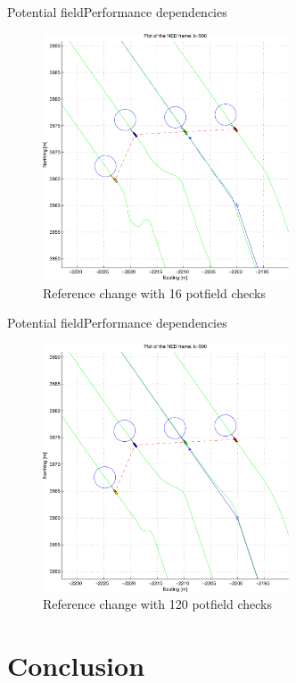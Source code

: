 \documentclass[10pt,handout]{beamer}
\begin{document}
\begin{frame}{Potential field}{Performance dependencies}
  \begin{figure}
    \includegraphics[width=0.65\textwidth]{img/pdfwobble16}
    \caption{Reference change with 16 potfield checks}
  \end{figure}
\end{frame}

\begin{frame}{Potential field}{Performance dependencies}
  \begin{figure}
    \includegraphics[width=0.65\textwidth]{img/pdfwobble120}
    \caption{Reference change with 120 potfield checks}
  \end{figure}
\end{frame}

\section{Conclusion}
\end{document}
